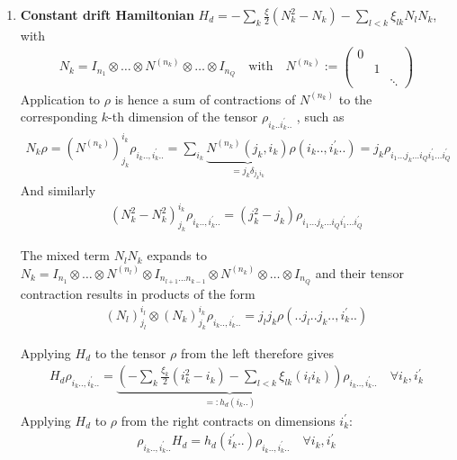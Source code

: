 \documentclass[letterpaper]{article}
\begin{document}
\begin{enumerate}
    \item \textbf{Constant drift Hamiltonian} $H_d = -\sum_k \frac{\xi}{2} \left(N_k^2 - N_k\right) - \sum_{l<k} \xi_{lk} N_lN_k$, with
      \begin{align}
      N_k = I_{n_1}\otimes \dots \otimes N^{(n_k)} \otimes \dots \otimes I_{n_Q} \quad \text{with} \quad N^{(n_k)} := \begin{pmatrix} 0 & & \\ & 1& \\ & & \ddots \end{pmatrix}
      \end{align}
      Application to $\rho$ is hence a sum of contractions of $N^{(n_k)}$ to the corresponding $k$-th dimension of the tensor $\rho_{i_k..i_k^\prime..}$ , such as
      \begin{align}
        N_k \rho = \left(N^{(n_k)}\right)_{j_k}^{i_k} \rho_{i_k .., i_k^\prime ..} = \sum_{i_k} \underbrace{N^{(n_k)}(j_k, i_k)}_{ = j_k\delta_{j_ki_k} } \rho(i_k.., i_k^\prime ..) = j_k \rho_{i_1\dots j_k \dots i_Q i_1^\prime \dots i_Q^\prime}
      \end{align}
      And similarly
      \begin{align}
        \left(N_k^2-N_k^2\right)_{j_k}^{i_k} \rho_{i_k .., i_k^\prime ..} = \left(j_k^2 - j_k\right) \rho_{i_1\dots j_k \dots i_Q i_1^\prime \dots i_Q^\prime}
      \end{align}

      The mixed term $N_lN_k$ expands to $N_k = I_{n_1}\otimes \dots \otimes N^{(n_l)} \otimes I_{n_{l+1} \dots n_{k-1}}\otimes N^{(n_k)} \otimes \dots \otimes I_{n_Q}$ and their tensor contraction results in products of the form 
      \begin{align}
        (N_l)^{i_l}_{j_l} \otimes (N_k)_{j_k}^{i_k} \rho_{i_k .., i_k^\prime ..} = j_lj_k\rho(..j_l .. j_k.., i_k^\prime ..)
      \end{align}

      Applying $H_d$ to the tensor $\rho$ from the left therefore gives  
      \begin{align}
        H_d \rho_{i_k .., i_k^\prime ..} = \underbrace{\left(-\sum_k \frac{\xi_k}{2}(i_k^2 - i_k) - \sum_{l<k} \xi_{lk} (i_l i_k) \right)}_{=:h_d(i_k..)} \rho_{i_k .., i_k^\prime..} \quad \forall i_k, i_k^\prime
      \end{align}
      Applying $H_d$ to $\rho$ from the right contracts on dimensions $i_k^\prime$:
      \begin{align}
        \rho_{i_k .., i_k^\prime ..} H_d  = h_d(i_k^\prime..) \rho_{i_k .., i_k^\prime..} \quad \forall i_k, i_k^\prime
        \end{align}


\end{enumerate}
\end{document}
